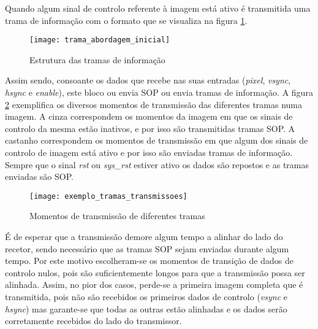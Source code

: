 Quando algum sinal de controlo referente à imagem está ativo é transmitida uma trama de informação com o formato que se visualiza na figura \ref{fig:trama_abordagem_inicial}.

\begin{figure}[h!]
	\begin{center}
		\leavevmode
		\texttt{[image: trama\_abordagem\_inicial]}
		\captionsetup{width=1.0\linewidth}
		\caption[Estrutura das tramas de informação]{Estrutura das tramas de informação}
		\label{fig:trama_abordagem_inicial}
	\end{center}
\end{figure}

Assim sendo, consoante os dados que recebe nas suas entradas (\textit{pixel}, \textit{vsync}, \textit{hsync} e \textit{enable}), este bloco ou envia SOP ou envia tramas de informação. A figura \ref{fig:momentos_tramas} exemplifica os diversos momentos de transmissão das diferentes tramas numa imagem. A cinza correspondem os momentos da imagem em que os sinais de controlo da mesma estão inativos, e por isso são transmitidas tramas SOP. A castanho correspondem os momentos de transmissão em que algum dos sinais de controlo de imagem está ativo e por isso são enviadas tramas de informação. Sempre que o sinal \textit{rst} ou \textit{sys\_rst} estiver ativo os dados são repostos e as tramas enviadas são SOP. 

\begin{figure}[h!]
	\begin{center}
		\leavevmode
		\texttt{[image: exemplo\_tramas\_transmissoes]}
		\captionsetup{width=1.0\linewidth}
		\caption[Momentos de transmissão de diferentes tramas]{Momentos de transmissão de diferentes tramas}
		\label{fig:momentos_tramas}
	\end{center}
\end{figure}

É de esperar que a transmissão demore algum tempo a alinhar do lado do recetor, sendo necessário que as tramas SOP sejam enviadas durante algum tempo. Por este motivo escolheram-se os momentos de transição de dados de controlo nulos, pois são suficientemente longos para que a transmissão possa ser alinhada. Assim, no pior dos casos, perde-se a primeira imagem completa que é transmitida, pois não são recebidos os primeiros dados de controlo (\textit{vsync} e \textit{hsync}) mas garante-se que todas as outras estão alinhadas e os dados serão corretamente recebidos do lado do transmissor.

